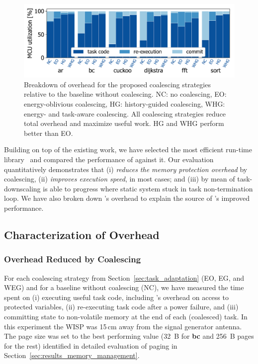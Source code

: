 \begin{figure}
	\centering
	\includegraphics[width=\columnwidth]{figures/coalEfficiency}
    \caption{Breakdown of overhead for the proposed coalescing strategies
relative to the baseline without coalescing.
NC: no coalescing, EO: energy-oblivious coalescing, HG: history-guided coalescing, WHG:
energy- and task-aware coalescing. All coalescing strategies reduce total
overhead and maximize useful work. HG and WHG perform better than EO.}
	\label{fig:overallOverheadBreakdown}
\end{figure}
%
Building on top of the existing work, we have selected the most efficient run-time library~\cite{alpaca} and compared the performance of \sys against it.
Our evaluation quantitatively demonstrates that \sys (i) \emph{reduces the memory
protection overhead} by coalescing, (ii) \emph{improves execution speed}, in most cases; %
and (iii) by mean of task-downscaling \sys is able to progress where static system stuck in task non-termination loop. 
We have also broken down \sys's overhead to explain the source of \sys's improved performance.
%
\subsection{Characterization of Overhead}
\label{sec:coala_overhead}

\subsubsection{Overhead Reduced by Coalescing}
\label{sec:overhead-coalescing}

For each coalescing strategy from Section~\ref{sec:task_adaptation} (EO, EG,
and WEG) and for a baseline without coalescing (NC), we have measured the time
spent on (i) executing useful task code, including \sys's overhead on access to
protected variables, (ii) re-executing task code after a power failure, and
(iii) committing state to non-volatile memory at the end of each (coalesced)
task.  In this experiment the WISP was 15\,cm away from the signal generator
antenna.
%
The page size was set to the best performing value (32~B for \textbf{bc} and
256~B pages for the rest) identified in detailed evaluation of paging in
Section~\ref{sec:results_memory_management}.

